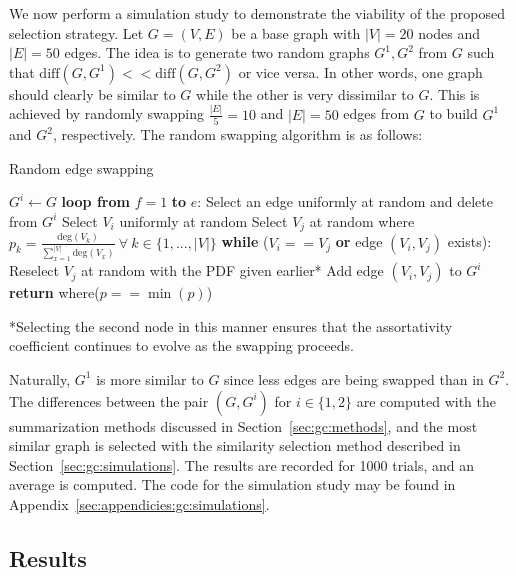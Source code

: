 We now perform a simulation study to demonstrate the viability of the proposed 
selection strategy. Let $G=(V,E)$ be a base graph with $|V|=20$ nodes and 
$|E|=50$ edges. The idea is to generate two random graphs $G^1, G^2$ from $G$ 
such that $\text{diff}(G,G^1) << \text{diff}(G,G^2)$ or vice versa. 
In other words, one graph should clearly be similar to $G$ while the other is 
very dissimilar to $G$. This is achieved by randomly swapping $\frac{|E|}{5} = 
10$ and $|E| = 50$ edges from $G$ to build $G^1$ and $G^2$, respectively. 
The random swapping algorithm is as follows:

\tablespacing
\begin{algorithm}[H]
	\caption{Random edge swapping}\label{alg:gc:simulations:swapping}
	\begin{algorithmic}[1]
		\State $G^i \gets G$
		\State \textbf{loop from} $f=1$ \textbf{to} $e$:
		\State \indent Select an edge uniformly at random and delete from $G^i$
		\State \indent Select $V_i$ uniformly at random
		\State \indent Select $V_j$ at random where 
		$p_k = \frac{\text{deg}(V_k)}{\sum\limits_{x=1}^{|V|} \text{deg}(V_x)} 
		\ \forall \
		k \in \{1,...,|V|\}$
		\State \indent \textbf{while} ($V_i == V_j$ \textbf{or} edge 
		$(V_i,V_j)$ exists):
		\State \indent \indent Reselect $V_j$ at random with the PDF given 
		earlier*
		\State \indent Add edge $(V_i,V_j)$ to $G^i$
		\State \textbf{return} where($p==\min{(p)}$)
		\EndProcedure
	\end{algorithmic}
	*Selecting the second node in this manner ensures that the assortativity 
	coefficient continues to evolve as the swapping proceeds. 
\end{algorithm}
\bodyspacing

\noindent Naturally, $G^1$ is more similar to $G$ since less 
edges are being swapped than in $G^2$. The differences between the pair 
$(G,G^i)$ for $i \in \{1,2\}$ are computed with the summarization 
methods discussed in Section~\ref{sec:gc:methods}, and the most similar 
graph is selected with the similarity selection method described in 
Section~\ref{sec:gc:simulations}. 
The results are recorded for 1000 trials, and an average is computed. 
The code for the simulation study may be found in 
Appendix~\ref{sec:appendicies:gc:simulations}. 

\subsection{Results}
\label{sec:gc:simulations:results}


